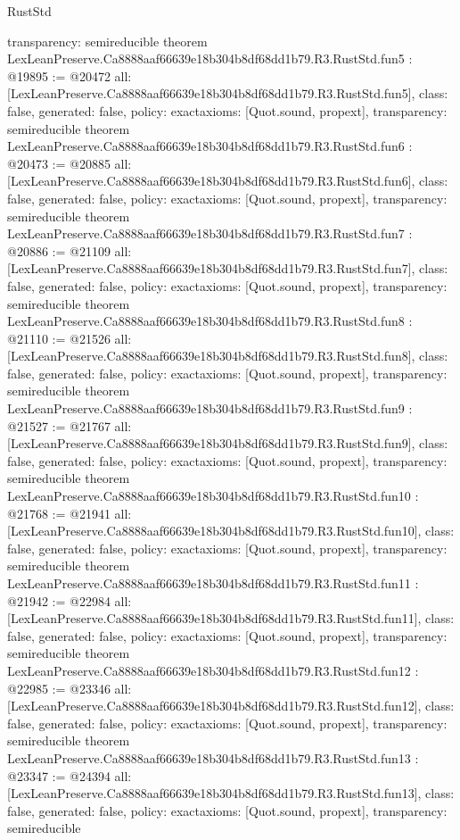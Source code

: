 \begin{lexlean}{RustStd}
\begin{coremodule}
{  transparency: semireducible
}
theorem LexLeanPreserve.Ca8888aaf66639e18b304b8df68dd1b79.R3.RustStd.fun5 : @19895 := @20472 {
  all: [LexLeanPreserve.Ca8888aaf66639e18b304b8df68dd1b79.R3.RustStd.fun5],
  class: false,
  generated: false,
  policy: exact{axioms: [Quot.sound, propext]},
  transparency: semireducible
}
theorem LexLeanPreserve.Ca8888aaf66639e18b304b8df68dd1b79.R3.RustStd.fun6 : @20473 := @20885 {
  all: [LexLeanPreserve.Ca8888aaf66639e18b304b8df68dd1b79.R3.RustStd.fun6],
  class: false,
  generated: false,
  policy: exact{axioms: [Quot.sound, propext]},
  transparency: semireducible
}
theorem LexLeanPreserve.Ca8888aaf66639e18b304b8df68dd1b79.R3.RustStd.fun7 : @20886 := @21109 {
  all: [LexLeanPreserve.Ca8888aaf66639e18b304b8df68dd1b79.R3.RustStd.fun7],
  class: false,
  generated: false,
  policy: exact{axioms: [Quot.sound, propext]},
  transparency: semireducible
}
theorem LexLeanPreserve.Ca8888aaf66639e18b304b8df68dd1b79.R3.RustStd.fun8 : @21110 := @21526 {
  all: [LexLeanPreserve.Ca8888aaf66639e18b304b8df68dd1b79.R3.RustStd.fun8],
  class: false,
  generated: false,
  policy: exact{axioms: [Quot.sound, propext]},
  transparency: semireducible
}
theorem LexLeanPreserve.Ca8888aaf66639e18b304b8df68dd1b79.R3.RustStd.fun9 : @21527 := @21767 {
  all: [LexLeanPreserve.Ca8888aaf66639e18b304b8df68dd1b79.R3.RustStd.fun9],
  class: false,
  generated: false,
  policy: exact{axioms: [Quot.sound, propext]},
  transparency: semireducible
}
theorem LexLeanPreserve.Ca8888aaf66639e18b304b8df68dd1b79.R3.RustStd.fun10 : @21768 := @21941 {
  all: [LexLeanPreserve.Ca8888aaf66639e18b304b8df68dd1b79.R3.RustStd.fun10],
  class: false,
  generated: false,
  policy: exact{axioms: [Quot.sound, propext]},
  transparency: semireducible
}
theorem LexLeanPreserve.Ca8888aaf66639e18b304b8df68dd1b79.R3.RustStd.fun11 : @21942 := @22984 {
  all: [LexLeanPreserve.Ca8888aaf66639e18b304b8df68dd1b79.R3.RustStd.fun11],
  class: false,
  generated: false,
  policy: exact{axioms: [Quot.sound, propext]},
  transparency: semireducible
}
theorem LexLeanPreserve.Ca8888aaf66639e18b304b8df68dd1b79.R3.RustStd.fun12 : @22985 := @23346 {
  all: [LexLeanPreserve.Ca8888aaf66639e18b304b8df68dd1b79.R3.RustStd.fun12],
  class: false,
  generated: false,
  policy: exact{axioms: [Quot.sound, propext]},
  transparency: semireducible
}
theorem LexLeanPreserve.Ca8888aaf66639e18b304b8df68dd1b79.R3.RustStd.fun13 : @23347 := @24394 {
  all: [LexLeanPreserve.Ca8888aaf66639e18b304b8df68dd1b79.R3.RustStd.fun13],
  class: false,
  generated: false,
  policy: exact{axioms: [Quot.sound, propext]},
  transparency: semireducible
}
\end{coremodule}
\end{lexlean}
